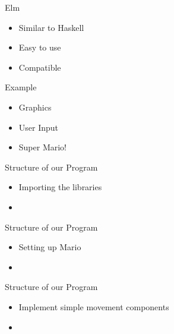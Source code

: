 \documentclass{beamer}
\begin{document}
    
        \begin{frame}{Elm}
            \begin{itemize}
                \item {} {Similar to Haskell}
                \item {} {Easy to use}
                \item {} {Compatible}
            \end{itemize}
        \end{frame}
        
        \begin{frame}{Example}
            \begin{itemize}
                \item {} {Graphics}
                \item {} {User Input}
                \item {} {Super Mario!}
            \end{itemize}
        \end{frame}
        
        \begin{frame}{Structure of our Program}
            \begin{itemize}
                \item Importing the libraries
                    \item \inputminted{haskell}{library.hs}
                    \end{itemize}
        \end{frame}

                    
        \begin{frame}{Structure of our Program}
            \begin{itemize}            
                \item Setting up Mario
                    \item \inputminted{haskell}{mario.hs}
                    \end{itemize}
        \end{frame}

                    
        \begin{frame}{Structure of our Program}
            \begin{itemize}            
                \item Implement simple movement components
                    \item \inputminted{haskell}{movement.hs}
                    \end{itemize}
        \end{frame}
\end{document}
